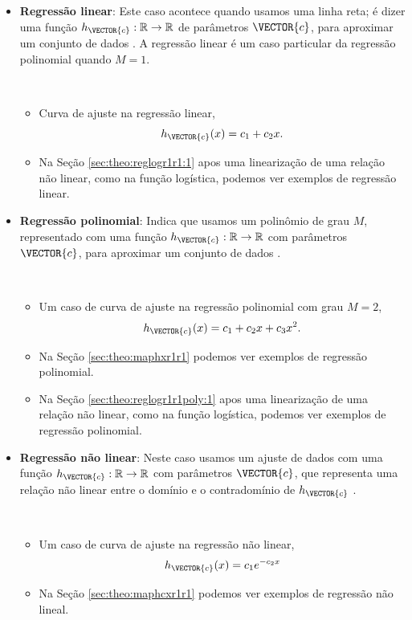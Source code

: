\begin{itemize}
\item \textbf{Regressão linear}: 
Este caso acontece quando usamos uma linha reta;
é dizer uma função $h_{\VECTOR{c}}:\mathbb{R} \rightarrow \mathbb{R}$ de parâmetros $\VECTOR{c}$, 
para aproximar um conjunto de dados \cite[pp. 398, 402]{chapra2016metodos} \cite[pp. 25]{aster2013parameter}.
A regressão linear é um caso particular da regressão polinomial quando $M=1$.
\begin{example}~
\begin{itemize}
\item Curva de ajuste na regressão linear, 
\begin{equation}
h_{\VECTOR{c}}(x)=c_1+c_2 x.
\end{equation}
\item Na Seção \ref{sec:theo:reglogr1r1:1} apos uma linearização de uma relação não linear,
como na função logística, podemos ver exemplos de regressão linear.
\end{itemize}
\end{example}

\item \textbf{Regressão polinomial}: 
Indica que usamos um polinômio de grau $M$,
representado com uma função $h_{\VECTOR{c}}:\mathbb{R} \rightarrow \mathbb{R}$ com parâmetros $\VECTOR{c}$, 
 para aproximar um conjunto de dados \cite[pp. 399, 415]{chapra2016metodos}.
\begin{example}~
\begin{itemize}
\item Um caso de curva de ajuste na regressão polinomial com grau $M=2$,
\begin{equation}
h_{\VECTOR{c}}(x)=c_1+c_2 x+c_3 x^2.
\end{equation}
\item Na Seção \ref{sec:theo:maphxr1r1} podemos ver exemplos de regressão polinomial.
\item Na Seção \ref{sec:theo:reglogr1r1poly:1} apos uma linearização de uma relação não linear,
como na função logística, podemos ver exemplos de regressão polinomial.
\end{itemize}
\end{example}

\item \textbf{Regressão não linear}: 
Neste caso usamos um ajuste de dados
com uma função $h_{\VECTOR{c}}:\mathbb{R} \rightarrow \mathbb{R}$ com parâmetros $\VECTOR{c}$, 
que representa uma relação não linear entre o domínio e o contradomínio de $h_{\VECTOR{c}}$ 
\cite[pp. 424]{chapra2016metodos} \cite[pp. 217]{agarwal2014creators}.
\begin{example}~
\begin{itemize}
\item Um caso de curva de ajuste na regressão não linear, 
\begin{equation}
h_{\VECTOR{c}}(x)=c_1 e^{-c_2 x}
\end{equation}
\item Na Seção \ref{sec:theo:maphcxr1r1} podemos ver exemplos de regressão não lineal.
\end{itemize}
\end{example}


\end{itemize}
